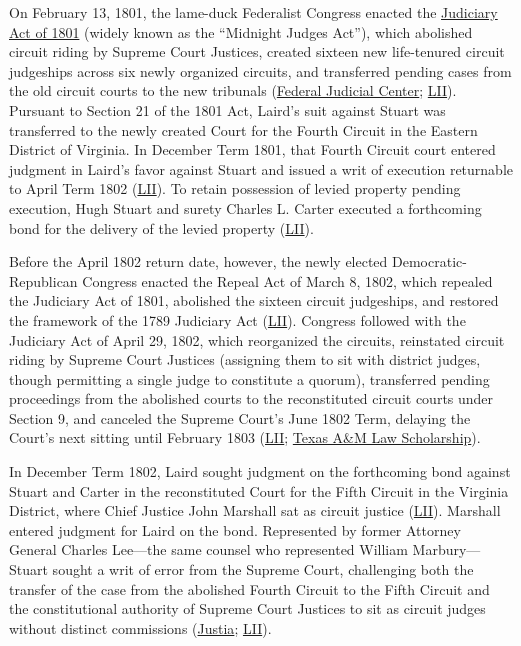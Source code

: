 \documentclass[12pt]{article}
\begin{document}
On February 13, 1801, the lame-duck Federalist Congress enacted the \href{https://www.fjc.gov/history/exhibits/judiciary-act-1801}{Judiciary Act of 1801} (widely known as the ``Midnight Judges Act''), which abolished circuit riding by Supreme Court Justices, created sixteen new life-tenured circuit judgeships across six newly organized circuits, and transferred pending cases from the old circuit courts to the new tribunals (\href{https://www.fjc.gov/history/exhibits/judiciary-act-1801}{Federal Judicial Center}; \href{https://www.law.cornell.edu/supremecourt/text/5/299}{LII}). Pursuant to Section 21 of the 1801 Act, Laird's suit against Stuart was transferred to the newly created Court for the Fourth Circuit in the Eastern District of Virginia. In December Term 1801, that Fourth Circuit court entered judgment in Laird's favor against Stuart and issued a writ of execution returnable to April Term 1802 (\href{https://www.law.cornell.edu/supremecourt/text/5/299}{LII}). To retain possession of levied property pending execution, Hugh Stuart and surety Charles L. Carter executed a forthcoming bond for the delivery of the levied property (\href{https://www.law.cornell.edu/supremecourt/text/5/299}{LII}).

Before the April 1802 return date, however, the newly elected Democratic-Republican Congress enacted the Repeal Act of March 8, 1802, which repealed the Judiciary Act of 1801, abolished the sixteen circuit judgeships, and restored the framework of the 1789 Judiciary Act (\href{https://www.law.cornell.edu/supremecourt/text/5/299}{LII}). Congress followed with the Judiciary Act of April 29, 1802, which reorganized the circuits, reinstated circuit riding by Supreme Court Justices (assigning them to sit with district judges, though permitting a single judge to constitute a quorum), transferred pending proceedings from the abolished courts to the reconstituted circuit courts under Section 9, and canceled the Supreme Court's June 1802 Term, delaying the Court's next sitting until February 1803 (\href{https://www.law.cornell.edu/supremecourt/text/5/299}{LII}; \href{https://scholarship.law.tamu.edu/cgi/viewcontent.cgi?article=3364&context=facscholar}{Texas A\&M Law Scholarship}).

In December Term 1802, Laird sought judgment on the forthcoming bond against Stuart and Carter in the reconstituted Court for the Fifth Circuit in the Virginia District, where Chief Justice John Marshall sat as circuit justice (\href{https://www.law.cornell.edu/supremecourt/text/5/299}{LII}). Marshall entered judgment for Laird on the bond. Represented by former Attorney General Charles Lee---the same counsel who represented William Marbury---Stuart sought a writ of error from the Supreme Court, challenging both the transfer of the case from the abolished Fourth Circuit to the Fifth Circuit and the constitutional authority of Supreme Court Justices to sit as circuit judges without distinct commissions (\href{https://supreme.justia.com/cases/federal/us/5/299/}{Justia}; \href{https://www.law.cornell.edu/supremecourt/text/5/299}{LII}).
\end{document}
